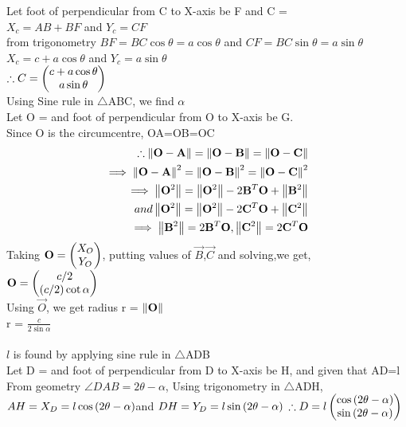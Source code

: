 \documentclass[journal,12pt,twocolumn]{IEEEtran}
\renewcommand\thesection{\arabic{section}}
\begin{document}
\begin{enumerate}[label=\thesection.\arabic*.,ref=\thesection.\theenumi]
Let foot of perpendicular from C to X-axis be F and C = \\
$X_c=AB+BF$ and $Y_c = CF$\\
from trigonometry $BF = BC\cos \theta = a\cos \theta$ and $CF = BC\sin \theta = a\sin \theta$ \\
$X_c = c + a\cos \theta$ and $Y_c = a\sin \theta$ \\ 
$\therefore C = \begin{pmatrix}c + a\cos \theta \\ a\sin \theta\end{pmatrix} $\\
Using Sine rule in $\bigtriangleup$ABC, we find $\alpha$\\
Let O =  and foot of perpendicular from O to X-axis be G.\\
Since O is the circumcentre, OA=OB=OC\\
\begin{align}
\therefore \left\lVert\mathbf{O} - \mathbf{A}\right\rVert = \left\lVert\mathbf{O} - \mathbf{B}\right\rVert = \left\lVert\mathbf{O} - \mathbf{C}\right\rVert\\
\implies \left\lVert\mathbf{O} - \mathbf{A}\right\rVert^{2} = \left\lVert\mathbf{O} - \mathbf{B}\right\rVert^{2} = \left\lVert\mathbf{O} - \mathbf{C}\right\rVert^{2}\\
\implies \left\lVert\mathbf{O}^{2}\right\rVert = \left\lVert\mathbf{O}^{2}\right\rVert - 2\mathbf{B}^{T}\mathbf{O} + \left\lVert\mathbf{B}^{2}\right\rVert\\ 
and \left\lVert\mathbf{O}^{2}\right\rVert = \left\lVert\mathbf{O}^{2}\right\rVert - 2\mathbf{C}^{T}\mathbf{O} + \left\lVert\mathbf{C}^{2}\right\rVert\\
\implies \left\lVert\mathbf{B}^{2}\right\rVert = 2\mathbf{B}^{T}\mathbf{O}, \left\lVert\mathbf{C}^{2}\right\rVert = 2\mathbf{C}^{T}\mathbf{O}\\
\end{align}
Taking $\mathbf{O} = \begin{pmatrix}X_O \\ Y_O\end{pmatrix}$, putting values of $\vec{B}$,$\vec{C}$ and solving,we get,\\
$\mathbf{O} = \begin{pmatrix}c/2 \\ \left(c/2\right) \cot \alpha\end{pmatrix} $ \\
Using $\vec{O}$, we get radius r = $\left\lVert\mathbf{O}\right\rVert$\\
r = $\frac{c}{2\sin \alpha}$\\
\\
$l$ is found by applying sine rule in $\bigtriangleup$ADB\\
Let D =  and foot of perpendicular from D to X-axis be H,
and given that AD=l\\
From geometry $\angle DAB = 2\theta-\alpha$,
Using trigonometry in $\bigtriangleup$ADH, 
$AH=X_D=l\cos \left(2\theta-\alpha\right)$and $DH=Y_D=l\sin \left(2\theta-\alpha\right)$
$\therefore D = l\begin{pmatrix}\cos \left(2\theta-\alpha\right) \\ \sin \left(2\theta-\alpha\right)\end{pmatrix} $\\
\\


\end{enumerate}
\end{document}
